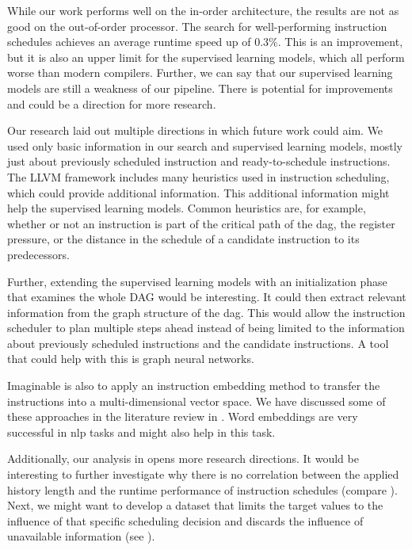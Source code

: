 While our work performs well on the in-order architecture, the results are not as good on the out-of-order processor.
The search for well-performing instruction schedules achieves an average runtime speed up of 0.3\%.
This is an improvement, but it is also an upper limit for the supervised learning models, which all perform worse than modern compilers.
Further, we can say that our supervised learning models are still a weakness of our pipeline.
There is potential for improvements and could be a direction for more research.
 
Our research laid out multiple directions in which future work could aim.
We used only basic information in our search and supervised learning models, mostly just about previously scheduled instruction and ready-to-schedule instructions.
The LLVM framework includes many heuristics used in instruction scheduling, which could provide additional information.
This additional information might help the supervised learning models.
Common heuristics are, for example, whether or not an instruction is part of the critical path of the \ac{dag}, the register pressure, or the distance in the schedule of a candidate instruction to its predecessors.

Further, extending the supervised learning models with an initialization phase that examines the whole DAG would be interesting.
It could then extract relevant information from the graph structure of the \ac{dag}.
This would allow the instruction scheduler to plan multiple steps ahead instead of being limited to the information about previously scheduled instructions and the candidate instructions.
A tool that could help with this is graph neural networks.

Imaginable is also to apply an instruction embedding method to transfer the instructions into a multi-dimensional vector space.
We have discussed some of these approaches in the literature review in .
Word embeddings are very successful in \ac{nlp} tasks and might also help in this task.

Additionally, our analysis in  opens more research directions.
It would be interesting to further investigate why there is no correlation between the applied history length and the runtime performance of instruction schedules (compare ).
Next, we might want to develop a dataset that limits the target values to the influence of that specific scheduling decision and discards the influence of unavailable information (see ).
